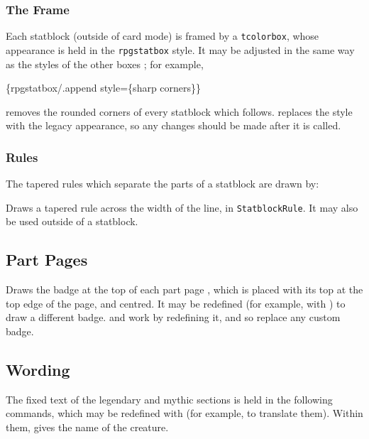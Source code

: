 			\subsubsection{The Frame}

				Each statblock (outside of card mode) is framed by a \texttt{tcolorbox}, whose appearance is held in the \texttt{rpgstatbox} style. It may be adjusted in the same way as the styles of the other boxes ; for example,
				\begin{center}
					\{rpgstatbox/.append style=\{sharp corners\}\}
				\end{center}
				removes the rounded corners of every statblock which follows.  replaces the style with the legacy appearance, so any changes should be made after it is called.

			\subsubsection{Rules}

				The tapered rules which separate the parts of a statblock are drawn by:

				{
					Draws a tapered rule across the width of the line, in \texttt{StatblockRule}. It may also be used outside of a statblock.
				}

		\subsection{Part Pages}

			{
				Draws the badge at the top of each part page , which is placed with its top at the top edge of the page, and centred. It may be redefined (for example, with ) to draw a different badge.  and  work by redefining it, and so replace any custom badge.
			}

		\subsection{Wording}

			The fixed text of the legendary and mythic sections  is held in the following commands, which may be redefined with  (for example, to translate them). Within them,  gives the name of the creature.

